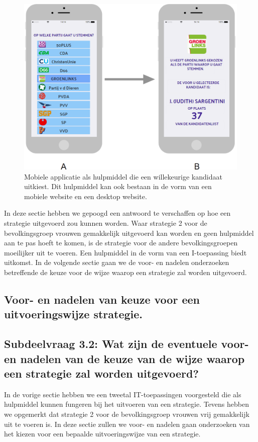 \begin{figure}[H]


	\includegraphics[width=\linewidth]{app_verkiezingen.png}

			\caption{Mobiele applicatie als hulpmiddel die een willekeurige kandidaat uitkiest. Dit hulpmiddel kan ook bestaan in de vorm van een mobiele website en een desktop website.}

\label{fig:verkA}
\end{figure}

In deze sectie hebben we gepoogd een antwoord te verschaffen op hoe een strategie uitgevoerd zou kunnen worden. Waar strategie 2 voor de bevolkingsgroep vrouwen gemakkelijk uitgevoerd kan worden en geen hulpmiddel aan te pas hoeft te komen, is de strategie voor de andere bevolkingsgroepen moeilijker uit te voeren. Een hulpmiddel in de vorm van een I-toepassing biedt uitkomst. In de volgende sectie gaan we de voor- en nadelen onderzoeken betreffende de keuze voor de wijze waarop een strategie zal worden uitgevoerd. 

\subsection{Voor- en nadelen van keuze voor een uitvoeringswijze strategie.}

\subsection*{Subdeelvraag 3.2: Wat zijn de eventuele voor- en nadelen van de keuze van de wijze waarop een strategie zal worden uitgevoerd?}
In de vorige sectie hebben we een tweetal IT-toepassingen voorgesteld die als hulpmiddel kunnen fungeren bij het uitvoeren van een strategie. Tevens hebben we opgemerkt dat strategie 2 voor de bevolkingsgroep vrouwen vrij gemakkelijk uit te voeren is. In deze sectie zullen we voor- en nadelen gaan onderzoeken van het kiezen voor een bepaalde uitvoeringswijze van een strategie. 

